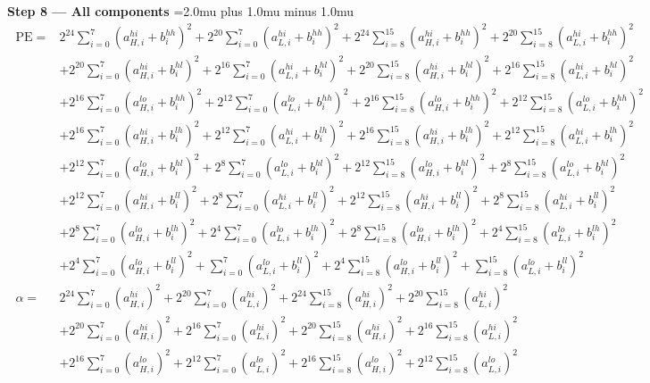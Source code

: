 \documentclass[fleqn]{article}
\begin{document}
\textbf{Step 8 --- All components}
{\footnotesize\setlength{\jot}{1pt}\medmuskip=2.0mu plus 1.0mu minus 1.0mu
\[
\boxed{\;
\begin{aligned}
\mathrm{PE} ={}& 2^{24}\sum_{i=0}^{7}(a_{H,i}^{hi}{+}b_i^{hh})^2 + 2^{20}\sum_{i=0}^{7}(a_{L,i}^{hi}{+}b_i^{hh})^2 + 2^{24}\sum_{i=8}^{15}(a_{H,i}^{hi}{+}b_i^{hh})^2 + 2^{20}\sum_{i=8}^{15}(a_{L,i}^{hi}{+}b_i^{hh})^2 \\
  & + 2^{20}\sum_{i=0}^{7}(a_{H,i}^{hi}{+}b_i^{hl})^2 + 2^{16}\sum_{i=0}^{7}(a_{L,i}^{hi}{+}b_i^{hl})^2 + 2^{20}\sum_{i=8}^{15}(a_{H,i}^{hi}{+}b_i^{hl})^2 + 2^{16}\sum_{i=8}^{15}(a_{L,i}^{hi}{+}b_i^{hl})^2 \\
  & + 2^{16}\sum_{i=0}^{7}(a_{H,i}^{lo}{+}b_i^{hh})^2 + 2^{12}\sum_{i=0}^{7}(a_{L,i}^{lo}{+}b_i^{hh})^2 + 2^{16}\sum_{i=8}^{15}(a_{H,i}^{lo}{+}b_i^{hh})^2 + 2^{12}\sum_{i=8}^{15}(a_{L,i}^{lo}{+}b_i^{hh})^2 \\
  & + 2^{16}\sum_{i=0}^{7}(a_{H,i}^{hi}{+}b_i^{lh})^2 + 2^{12}\sum_{i=0}^{7}(a_{L,i}^{hi}{+}b_i^{lh})^2 + 2^{16}\sum_{i=8}^{15}(a_{H,i}^{hi}{+}b_i^{lh})^2 + 2^{12}\sum_{i=8}^{15}(a_{L,i}^{hi}{+}b_i^{lh})^2 \\
  & + 2^{12}\sum_{i=0}^{7}(a_{H,i}^{lo}{+}b_i^{hl})^2 + 2^{8}\sum_{i=0}^{7}(a_{L,i}^{lo}{+}b_i^{hl})^2 + 2^{12}\sum_{i=8}^{15}(a_{H,i}^{lo}{+}b_i^{hl})^2 + 2^{8}\sum_{i=8}^{15}(a_{L,i}^{lo}{+}b_i^{hl})^2 \\
  & + 2^{12}\sum_{i=0}^{7}(a_{H,i}^{hi}{+}b_i^{ll})^2 + 2^{8}\sum_{i=0}^{7}(a_{L,i}^{hi}{+}b_i^{ll})^2 + 2^{12}\sum_{i=8}^{15}(a_{H,i}^{hi}{+}b_i^{ll})^2 + 2^{8}\sum_{i=8}^{15}(a_{L,i}^{hi}{+}b_i^{ll})^2 \\
  & + 2^{8}\sum_{i=0}^{7}(a_{H,i}^{lo}{+}b_i^{lh})^2 + 2^{4}\sum_{i=0}^{7}(a_{L,i}^{lo}{+}b_i^{lh})^2 + 2^{8}\sum_{i=8}^{15}(a_{H,i}^{lo}{+}b_i^{lh})^2 + 2^{4}\sum_{i=8}^{15}(a_{L,i}^{lo}{+}b_i^{lh})^2 \\
  & + 2^{4}\sum_{i=0}^{7}(a_{H,i}^{lo}{+}b_i^{ll})^2 + \sum_{i=0}^{7}(a_{L,i}^{lo}{+}b_i^{ll})^2 + 2^{4}\sum_{i=8}^{15}(a_{H,i}^{lo}{+}b_i^{ll})^2 + \sum_{i=8}^{15}(a_{L,i}^{lo}{+}b_i^{ll})^2 \\[0.3em]
\alpha ={}& 2^{24}\sum_{i=0}^{7}(a_{H,i}^{hi})^2 + 2^{20}\sum_{i=0}^{7}(a_{L,i}^{hi})^2 + 2^{24}\sum_{i=8}^{15}(a_{H,i}^{hi})^2 + 2^{20}\sum_{i=8}^{15}(a_{L,i}^{hi})^2 \\
  & + 2^{20}\sum_{i=0}^{7}(a_{H,i}^{hi})^2 + 2^{16}\sum_{i=0}^{7}(a_{L,i}^{hi})^2 + 2^{20}\sum_{i=8}^{15}(a_{H,i}^{hi})^2 + 2^{16}\sum_{i=8}^{15}(a_{L,i}^{hi})^2 \\
  & + 2^{16}\sum_{i=0}^{7}(a_{H,i}^{lo})^2 + 2^{12}\sum_{i=0}^{7}(a_{L,i}^{lo})^2 + 2^{16}\sum_{i=8}^{15}(a_{H,i}^{lo})^2 + 2^{12}\sum_{i=8}^{15}(a_{L,i}^{lo})^2 \\

\end{aligned}}\]}
\end{document}
